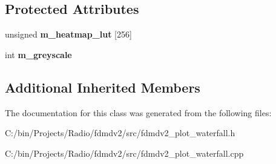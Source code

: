 \subsection*{Protected Attributes}
\begin{DoxyCompactItemize}
\item 
\hypertarget{class_plot_waterfall_aae04482318331ac760954376f23a1e3c}{unsigned {\bfseries m\-\_\-heatmap\-\_\-lut} \mbox{[}256\mbox{]}}\label{class_plot_waterfall_aae04482318331ac760954376f23a1e3c}

\item 
\hypertarget{class_plot_waterfall_a1cb3639849f17b1882b2b3713fd690cf}{int {\bfseries m\-\_\-greyscale}}\label{class_plot_waterfall_a1cb3639849f17b1882b2b3713fd690cf}

\end{DoxyCompactItemize}
\subsection*{Additional Inherited Members}


The documentation for this class was generated from the following files\-:\begin{DoxyCompactItemize}
\item 
C\-:/bin/\-Projects/\-Radio/fdmdv2/src/fdmdv2\-\_\-plot\-\_\-waterfall.\-h\item 
C\-:/bin/\-Projects/\-Radio/fdmdv2/src/fdmdv2\-\_\-plot\-\_\-waterfall.\-cpp\end{DoxyCompactItemize}
